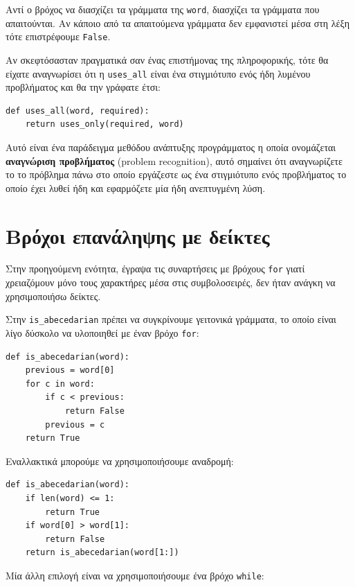 \documentclass[10pt]{book}
\begin{document}
Αντί ο βρόχος να διασχίζει τα γράμματα της {\tt word}, διασχίζει τα γράμματα που απαιτούνται. Αν κάποιο από τα απαιτούμενα γράμματα δεν εμφανιστεί μέσα στη λέξη τότε επιστρέφουμε {\tt False}.


Αν σκεφτόσασταν πραγματικά σαν ένας επιστήμονας της πληροφορικής, τότε θα είχατε αναγνωρίσει ότι η \verb"uses_all" είναι ένα στιγμιότυπο ενός ήδη λυμένου προβλήματος και θα την γράφατε έτσι:

\begin{verbatim}
def uses_all(word, required):
    return uses_only(required, word)
\end{verbatim}
%

Αυτό είναι ένα παράδειγμα μεθόδου ανάπτυξης προγράμματος η οποία ονομάζεται {\bf αναγνώριση προβλήματος} (problem recognition), αυτό σημαίνει ότι αναγνωρίζετε το το πρόβλημα πάνω στο οποίο εργάζεστε ως ένα στιγμιότυπο ενός προβλήματος το οποίο έχει λυθεί ήδη και εφαρμόζετε μία ήδη ανεπτυγμένη λύση.


\section{Βρόχοι επανάληψης με δείκτες}

Στην προηγούμενη ενότητα, έγραψα τις συναρτήσεις με βρόχους {\tt for} γιατί
χρειαζόμουν μόνο τους χαρακτήρες μέσα στις συμβολοσειρές, δεν ήταν ανάγκη να χρησιμοποιήσω δείκτες.

Στην \verb"is_abecedarian" πρέπει να συγκρίνουμε γειτονικά γράμματα, το οποίο είναι λίγο δύσκολο να υλοποιηθεί με έναν βρόχο {\tt for}:

\begin{verbatim}
def is_abecedarian(word):
    previous = word[0]
    for c in word:
        if c < previous:
            return False
        previous = c
    return True
\end{verbatim}


Εναλλακτικά μπορούμε να χρησιμοποιήσουμε αναδρομή:

\begin{verbatim}
def is_abecedarian(word):
    if len(word) <= 1:
        return True
    if word[0] > word[1]:
        return False
    return is_abecedarian(word[1:])
\end{verbatim}


Μία άλλη επιλογή είναι να χρησιμοποιήσουμε ένα βρόχο {\tt while}:
\end{document}
